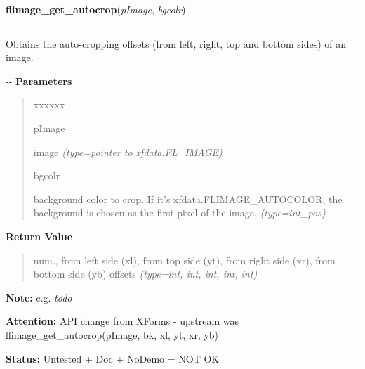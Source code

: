     \vspace{0.5ex}

\hspace{.8\funcindent}\begin{boxedminipage}{\funcwidth}

    \raggedright \textbf{flimage\_get\_autocrop}(\textit{pImage}, \textit{bgcolr})

    \vspace{-1.5ex}

    \rule{\textwidth}{0.5\fboxrule}
\setlength{\parskip}{2ex}

Obtains the auto-cropping offsets (from left, right, top and bottom
sides) of an image.

-{}-
\setlength{\parskip}{1ex}
      \textbf{Parameters}
      \vspace{-1ex}

      \begin{quote}
        \begin{Ventry}{xxxxxx}

          \item[pImage]


image
            {\it (type=pointer to xfdata.FL\_IMAGE)}

          \item[bgcolr]


background color to crop. If it's xfdata.FLIMAGE\_AUTOCOLOR, the
background is chosen as the first pixel of the image.
            {\it (type=int\_pos)}

        \end{Ventry}

      \end{quote}

      \textbf{Return Value}
    \vspace{-1ex}

      \begin{quote}

num., from left side (xl), from top side (yt), from right side
(xr), from bottom side (yb) offsets
      {\it (type=int, int, int, int, int)}

      \end{quote}

\textbf{Note:} 
e.g. \emph{todo}


\textbf{Attention:} 
API change from XForms - upstream was
flimage\_get\_autocrop(pImage, bk, xl, yt, xr, yb)


\textbf{Status:} 
Untested + Doc + NoDemo = NOT OK


    \end{boxedminipage}

